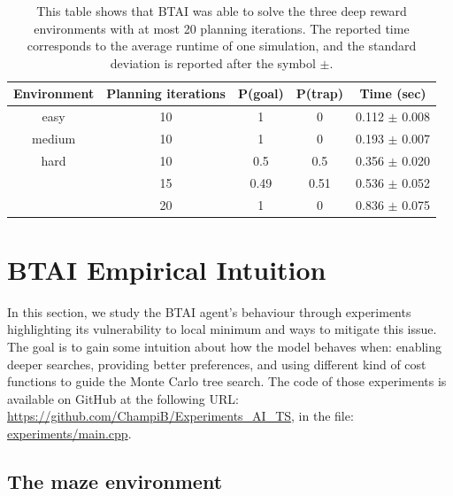 \documentclass[twoside,11pt]{article}
\begin{document}
\begin{table}[H]
\centering
\begin{tabular}{ |c|c|c|c|c|  }
 \hline
 Environment & Planning iterations & P(goal) & P(trap) & Time (sec) \\
 \hline
 easy & 10 & 1 & 0 & 0.112 $\pm$ 0.008 \\
 \hline
 medium & 10 & 1 & 0 & 0.193 $\pm$ 0.007 \\
 \hline
 hard & 10 & 0.5 & 0.5 & 0.356 $\pm$ 0.020 \\
  & 15 & 0.49 & 0.51 & 0.536 $\pm$ 0.052 \\
  & 20 & 1 & 0 & 0.836 $\pm$ 0.075 \\
 \hline
\end{tabular}
\caption{This table shows that BTAI was able to solve the three deep reward environments with at most 20 planning iterations. The reported time corresponds to the average runtime of one simulation, and the standard deviation is reported after the symbol $\pm$.}
\label{tab:303.2}
\end{table}

\section{BTAI Empirical Intuition} 

In this section, we study the BTAI agent's behaviour through experiments highlighting its vulnerability to local minimum and ways to mitigate this issue. The goal is to gain some intuition about how the model behaves when: enabling deeper searches, providing better preferences, and using different kind of cost functions to guide the Monte Carlo tree search. The code of those experiments is available on GitHub at the following URL: \url{https://github.com/ChampiB/Experiments_AI_TS}, in the file: \url{experiments/main.cpp}.

\subsection{The maze environment} \label{sec:env}
\end{document}
